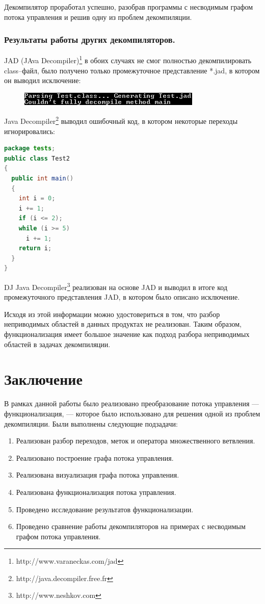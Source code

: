 Декомпилятор проработал успешно, разобрав программы с несводимым графом потока управления и решив одну из проблем декомпиляции.  

\subsubsection*{Результаты работы других декомпиляторов.}

JAD (JAva Decompiler)\footnote{http://www.varaneckas.com/jad} в обоих случаях не смог полностью декомпилировать class--файл, было получено только промежуточное представление *.jad, в котором он выводил исключение: 
\begin{figure}[H]
\begin{center}
\includegraphics[scale=1]{Zabransky/out.png}
\end{center} 
\end{figure}
Java Decompiler\footnote{http://java.decompiler.free.fr} выводил ошибочный код, в котором некоторые переходы игнорировались:

\begin{lstlisting}[language=JAVA]
package tests;
public class Test2
{
  public int main()
  {
    int i = 0;
    i += 1;
    if (i <= 2);
    while (i >= 5)
      i += 1;
    return i;
  }
}
\end{lstlisting}

DJ Java Decompiler\footnote{http://www.neshkov.com} реализован на основе JAD и выводил в итоге код промежуточного представления JAD, в котором было описано исключение.  

Исходя из этой информации можно удостовериться в том, что разбор неприводимых областей в данных продуктах не реализован. Таким образом, функционализация имеет большое значение как подход разбора неприводимых областей в задачах декомпиляции.

\section*{Заключение}

В рамках данной работы было реализовано преобразование потока управления --- функционализация, --- которое было использовано для решения одной из проблем декомпиляции. Были выполнены следующие подзадачи:
\begin{enumerate}
  		\item Реализован разбор переходов, меток и оператора множественного ветвления.
  		\item Реализовано построение графа потока управления.
  		\item Реализована визуализация графа потока управления.
  		\item Реализована функционализация потока управления.
		\item Проведено исследование результатов функционализации.
		\item Проведено сравнение работы декомпиляторов на примерах с несводимым графом потока управления.
\end{enumerate}


